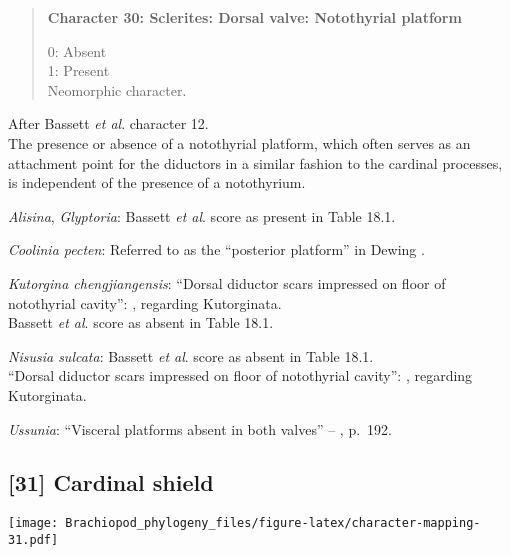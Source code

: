 \documentclass[openany]{book}
\theoremstyle{definition}
\theoremstyle{definition}
\theoremstyle{definition}
\theoremstyle{remark}
\begin{document}
\begin{quote}
\textbf{Character 30: Sclerites: Dorsal valve: Notothyrial platform}

0: Absent\\
1: Present\\
Neomorphic character.
\end{quote}

After Bassett \emph{et al}.
\citeyearpar{Bassett2001Functionalmorphology} character 12.\\
The presence or absence of a notothyrial platform, which often serves as
an attachment point for the diductors in a similar fashion to the
cardinal processes, is independent of the presence of a notothyrium.

\hypertarget{Alisina-coding-30}{}
\emph{Alisina}, \emph{Glyptoria}: Bassett \emph{et al}.
\citeyearpar{Bassett2001Functionalmorphology} score as present in Table
18.1.

\hypertarget{Coolinia_pecten-coding-30}{}
\emph{Coolinia pecten}: Referred to as the ``posterior platform'' in
Dewing \citeyearpar{Dewing2001Hingemodifications}.

\hypertarget{Kutorgina_chengjiangensis-coding-30}{}
\emph{Kutorgina chengjiangensis}: ``Dorsal diductor scars impressed on
floor of notothyrial cavity'':
\citet{Williams2000LinguliformeaCraniiformea}, regarding Kutorginata.\\
Bassett \emph{et al}. \citeyearpar{Bassett2001Functionalmorphology}
score as absent in Table 18.1.

\hypertarget{Nisusia_sulcata-coding-30}{}
\emph{Nisusia sulcata}: Bassett \emph{et al}.
\citeyearpar{Bassett2001Functionalmorphology} score as absent in Table
18.1.\\
``Dorsal diductor scars impressed on floor of notothyrial cavity'':
\citet{Williams2000LinguliformeaCraniiformea}, regarding Kutorginata.

\hypertarget{Ussunia-coding-30}{}
\emph{Ussunia}: ``Visceral platforms absent in both valves'' --
\citet{Williams2000LinguliformeaCraniiformea}, p.~192.

\subsection*{{[}31{]} Cardinal shield}\label{cardinal-shield}

\texttt{[image: Brachiopod\_phylogeny\_files/figure-latex/character-mapping-31.pdf]}
\end{document}
